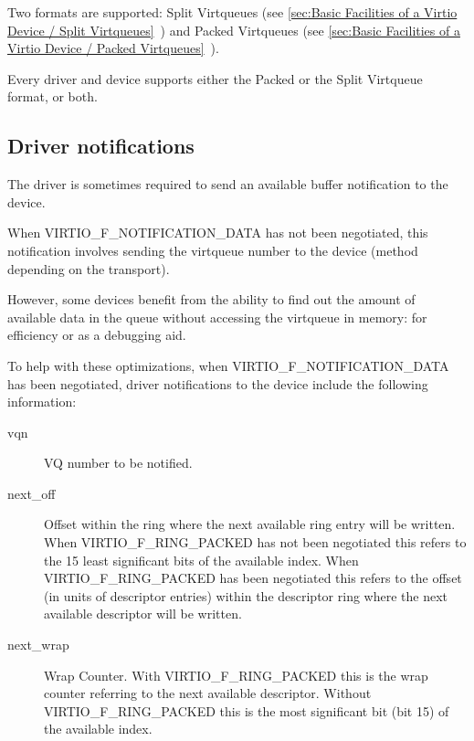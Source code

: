 Two formats are supported: Split Virtqueues (see \ref{sec:Basic
Facilities of a Virtio Device / Split
Virtqueues}~) and Packed Virtqueues (see \ref{sec:Basic
Facilities of a Virtio Device / Packed
Virtqueues}~).

Every driver and device supports either the Packed or the Split
Virtqueue format, or both.





\subsection{Driver notifications} \label{sec:Virtqueues / Driver notifications}
The driver is sometimes required to send an available buffer
notification to the device.

When VIRTIO_F_NOTIFICATION_DATA has not been negotiated,
this notification involves sending the
virtqueue number to the device (method depending on the transport).

However, some devices benefit from the ability to find out the
amount of available data in the queue without accessing the virtqueue in memory:
for efficiency or as a debugging aid.

To help with these optimizations, when VIRTIO_F_NOTIFICATION_DATA
has been negotiated, driver notifications to the device include
the following information:

\begin{description}
\item [vqn] VQ number to be notified.
\item [next_off] Offset
      within the ring where the next available ring entry
      will be written.
      When VIRTIO_F_RING_PACKED has not been negotiated this refers to the
      15 least significant bits of the available index.
      When VIRTIO_F_RING_PACKED has been negotiated this refers to the offset
      (in units of descriptor entries)
      within the descriptor ring where the next available
      descriptor will be written.
\item [next_wrap] Wrap Counter.
      With VIRTIO_F_RING_PACKED this is the wrap counter
      referring to the next available descriptor.
      Without VIRTIO_F_RING_PACKED this is the most significant bit
      (bit 15) of the available index.
\end{description}

